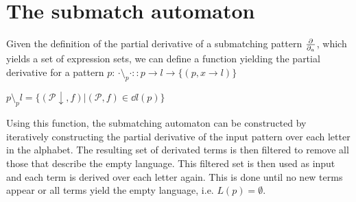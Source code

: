 \section{The submatch automaton}
\label{nfa}

Given the definition of the partial derivative of a submatching pattern $\frac{\partial}{\partial_{a}}$,
which yields a set of expression sets, we can define a function yielding the
partial derivative for a pattern $p$:
$\cdot \setminus_p \cdot :: p \to l \to \{(p, x \to l)\}$

$p \setminus_p l = \{ (\mathcal{P}\downarrow, f) | (\mathcal{P}, f) \in \dd{l}(p) \}$

Using this function, the submatching automaton can be constructed by iteratively
constructing the partial derivative of the input pattern over each letter in the
alphabet. The resulting set of derivated terms is then filtered to remove all
those that describe the empty language. This filtered set is then used as input
and each term is derived over each letter again. This is done until no new terms
appear or all terms yield the empty language, i.e. $L(p) = \emptyset$.

\pagebreak

